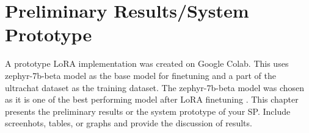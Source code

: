 \chapter{Preliminary Results/System Prototype}
A prototype LoRA implementation was created on Google Colab. 
This uses zephyr-7b-beta model as the base model for finetuning and a part of the ultrachat dataset as the training dataset.
The zephyr-7b-beta model was chosen as it is one of the best performing model after LoRA finetuning \cite{zhao2024loraland310finetuned}.
This chapter  presents the preliminary results or the system prototype of your SP.  Include screenhots, tables, or graphs and provide the discussion of results.
